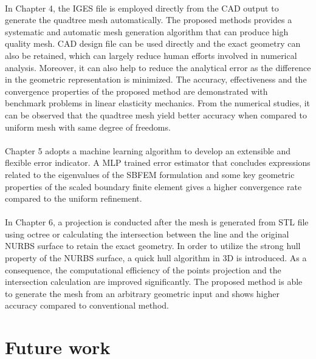 \paragraph{}
In Chapter 4, the IGES file is employed directly from the CAD output to generate the quadtree mesh automatically.
The proposed methods provides a systematic and automatic mesh generation algorithm that can produce high quality mesh.
CAD design file can be used directly and the exact geometry can also be retained, which can largely reduce human efforts involved in numerical analysis.
Moreover, it can also help to reduce the analytical error as the difference in the geometric representation is minimized.
The accuracy, effectiveness and the convergence properties of the proposed method are demonstrated with benchmark problems in linear elasticity mechanics.
From the numerical studies, it can be observed that the quadtree mesh yield better accuracy when compared to uniform mesh with same degree of freedoms.

\paragraph{}
Chapter 5 adopts a machine learning algorithm to develop an extensible and flexible error indicator.
A MLP trained error estimator that concludes expressions related to the eigenvalues of the SBFEM formulation and some key geometric properties of the scaled boundary finite element gives a higher convergence rate compared to the uniform refinement.

\paragraph{}
In Chapter 6, a projection is conducted after the mesh is generated from STL file using octree or calculating the intersection between the line and the original NURBS surface to retain the exact geometry.
In order to utilize the strong hull property of the NURBS surface, a quick hull algorithm in 3D is introduced.
As a consequence, the computational efficiency of the points projection and the intersection calculation are improved significantly.
The proposed method is able to generate the mesh from an arbitrary geometric input and shows higher accuracy compared to conventional method.


\section{Future work}

